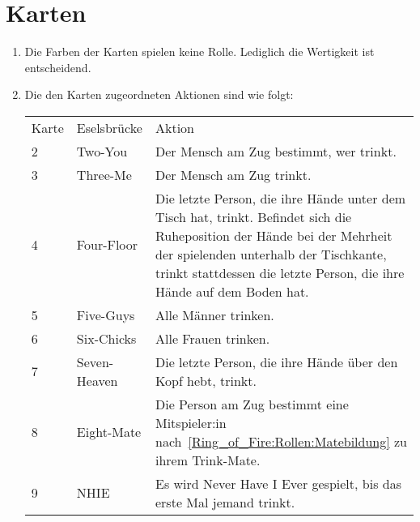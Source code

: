 \section{Karten}\label{Ring_of_Fire:Karten}
\begin{enumerate}[label={(\arabic*)}]
	\item
	Die Farben der Karten spielen keine Rolle. Lediglich die Wertigkeit ist entscheidend.
	
	\item\label{Ring_of_Fire:Karten:Tabelle}
	Die den Karten zugeordneten Aktionen sind wie folgt:


	\begin{tabulary}{\textwidth}{llL} %
		\toprule
		Karte & Eselsbrücke & Aktion \\
		2  & Two-You        & Der Mensch am Zug bestimmt, wer trinkt.                                                                                                              \\[1ex]
		3  & Three-Me       & Der Mensch am Zug trinkt.                                                                                                                            \\[1ex]
		4  & Four-Floor     & Die letzte Person, die ihre Hände unter dem Tisch hat, trinkt.
		Befindet sich die Ruheposition der Hände bei der Mehrheit der spielenden unterhalb der Tischkante, trinkt stattdessen die letzte Person, die ihre Hände auf dem Boden hat. \\[1ex]
		5  & Five-Guys      & Alle Männer trinken.                                                                                                                                 \\[1ex]
		6  & Six-Chicks     & Alle Frauen trinken.                                                                                                                                 \\[1ex]
		7  & Seven-Heaven   & Die letzte Person, die ihre Hände über den Kopf hebt, trinkt.                                                                                        \\[1ex]
		8  & Eight-Mate     & Die Person am Zug bestimmt eine Mitspieler:in nach~\ref{Ring_of_Fire:Rollen:Matebildung} zu ihrem Trink-Mate.                                                                                   \\[1ex]
		9  & NHIE           & Es wird \glqq{}Never Have I Ever\grqq{} gespielt, bis das erste Mal jemand trinkt.                                                                    \\[1ex]

\end{tabulary}
\end{enumerate}

